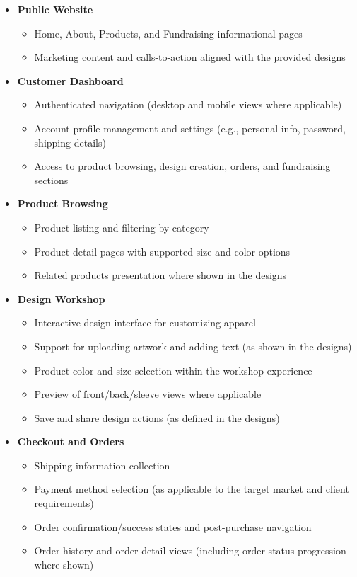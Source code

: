 \begin{itemize}[leftmargin=1.5em]

    \item \textbf{Public Website}
    \begin{itemize}
        \item Home, About, Products, and Fundraising informational pages
        \item Marketing content and calls-to-action aligned with the provided designs
    \end{itemize}

    \item \textbf{Customer Dashboard}
    \begin{itemize}
        \item Authenticated navigation (desktop and mobile views where applicable)
        \item Account profile management and settings (e.g., personal info, password, shipping details)
        \item Access to product browsing, design creation, orders, and fundraising sections
    \end{itemize}

    \item \textbf{Product Browsing}
    \begin{itemize}
        \item Product listing and filtering by category
        \item Product detail pages with supported size and color options
        \item Related products presentation where shown in the designs
    \end{itemize}

    \item \textbf{Design Workshop}
    \begin{itemize}
        \item Interactive design interface for customizing apparel
        \item Support for uploading artwork and adding text (as shown in the designs)
        \item Product color and size selection within the workshop experience
        \item Preview of front/back/sleeve views where applicable
        \item Save and share design actions (as defined in the designs)
    \end{itemize}

    \item \textbf{Checkout and Orders}
    \begin{itemize}
        \item Shipping information collection
        \item Payment method selection (as applicable to the target market and client requirements)
        \item Order confirmation/success states and post-purchase navigation
        \item Order history and order detail views (including order status progression where shown)
    \end{itemize}


\end{itemize}
